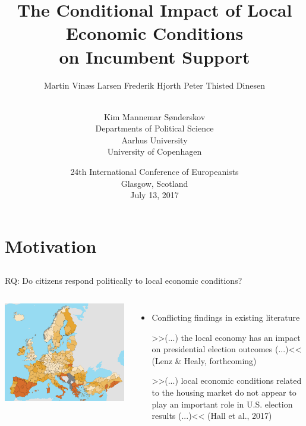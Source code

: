 \documentclass[10pt,aspectratio=169]{beamer}
\title[Conditional Impact]{The Conditional Impact of Local Economic Conditions \\ on Incumbent Support}
\author[Larsen et al.]{Martin Vin\ae s Larsen \qquad Frederik Hjorth \qquad Peter Thisted  Dinesen  \and  \\ Kim Mannemar  S\o nderskov \vspace{0.1in}  \\Departments of Political Science \\ Aarhus University \\ University of Copenhagen }
\date[July 13, 2017]{24th International Conference of Europeanists \\ Glasgow, Scotland \\ July 13, 2017}
\begin{document}
	
\begin{frame}
\titlepage
\end{frame}

\begin{frame}
\end{frame}

\section{Motivation}
\subsection{}
\begin{frame}

RQ: Do citizens respond politically to local economic conditions? 
\begin{columns}
	\includegraphics[width=0.99\textwidth]{../../figures/eurostat}
		\pause
	\begin{itemize}[<+->]
		\item Conflicting findings in existing literature
		\begin{block}{}
			>>(...) the local economy \alert{has an impact} on presidential election outcomes (...)<< (Lenz \& Healy, forthcoming)
		\end{block}
		\begin{block}{}
			>>(...) local economic conditions related to the housing market \alert{do not appear to play an important role} in U.S. election results (...)<< (Hall et al., 2017) \pause
		\end{block}
	\end{itemize}
\end{columns}

\end{frame}
\end{document}

